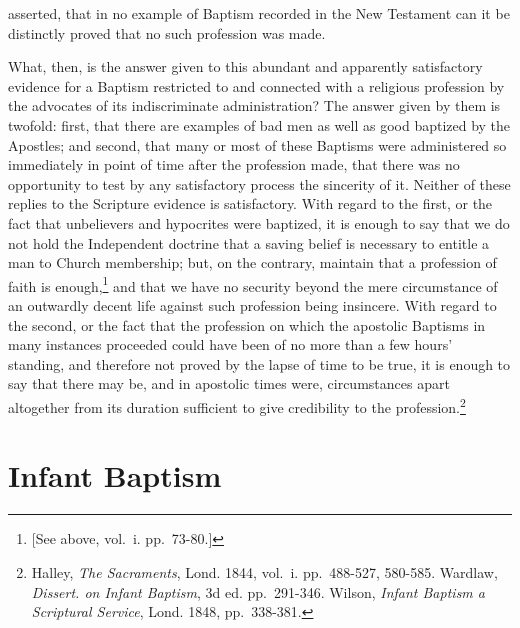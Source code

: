 \documentclass[english,]{book}
\begin{document}
asserted, that in no example of Baptism recorded in the New Testament can it be distinctly proved that no such profession was made.

What, then, is the answer given to this abundant and apparently satisfactory evidence for a Baptism restricted to and connected with a religious profession by the advocates of its indiscriminate administration? The answer given by them is twofold: first, that there are examples of bad men as well as good baptized by the Apostles; and second, that many or most of these Baptisms were administered so immediately in point of time after the profession made, that there was no opportunity to test by any satisfactory process the sincerity of it. Neither of these replies to the Scripture evidence is satisfactory. With regard to the first, or the fact that unbelievers and hypocrites were baptized, it is enough to say that we do not hold the Independent doctrine that a saving belief is necessary to entitle a man to Church membership; but, on the contrary, maintain that a profession of faith is enough,\footnote{{[}See above, vol.~i. pp.~73-80.{]}} and that we have no security beyond the mere circumstance of an outwardly decent life against such profession being insincere. With regard to the second, or the fact that the profession on which the apostolic Baptisms in many instances proceeded could have been of no more than a few hours' standing, and therefore not proved by the lapse of time to be true, it is enough to say that there may be, and in apostolic times were, circumstances apart altogether from its duration sufficient to give credibility to the profession.\footnote{Halley, \emph{The Sacraments}, Lond. 1844, vol.~i. pp.~488-527, 580-585. Wardlaw, \emph{Dissert. on Infant Baptism}, 3d ed. pp.~291-346. Wilson, \emph{Infant Baptism a Scriptural Service}, Lond. 1848, pp.~338-381.}

\hypertarget{infant-baptism}{%
\section{Infant Baptism}\label{infant-baptism}}
\end{document}

